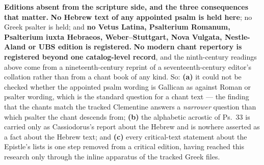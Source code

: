 \textbf{Editions absent from the scripture side, and the three consequences that
matter.} \textbf{No Hebrew text of any appointed psalm is held here}; no Greek
psalter is held; and \textbf{no Vetus Latina, Psalterium Romanum, Psalterium
iuxta Hebraeos, Weber--Stuttgart, Nova Vulgata, Nestle-Aland or UBS edition is
registered.} \textbf{No modern chant repertory is registered beyond one
catalog-level record}, and the ninth-century readings above come from a
nineteenth-century reprint of a seventeenth-century editor's collation rather
than from a chant book of any kind. So: \textbf{(a)} it could not be checked whether the appointed psalm
wording is Gallican as against Roman or  psalter wording,
which is the standard question for a chant text --- the finding that the chants
match the tracked Clementine answers a \emph{narrower} question than which
psalter the chant descends from; \textbf{(b)} the alphabetic acrostic of Ps.~33
is carried only as Cassiodorus's report about the Hebrew and is nowhere asserted
as a fact about the Hebrew text; and \textbf{(c)} every critical-text statement
about the Epistle's lists is one step removed from a critical edition, having
reached this research only through the inline apparatus of the tracked Greek
files.

